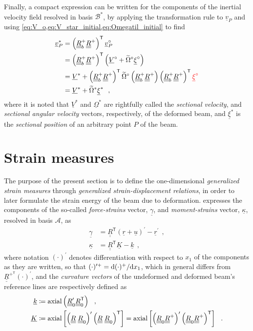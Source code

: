 \documentclass[12pt,a4paper,oneside,english]{abntex2} %
\newcommand{\fix}[1]{{\color{red}#1}}
\newcommand{\vect}[1]{\underline{#1}}
\def\tens#1{\underline{\underline{#1}}}
\def\til#1{\widetilde{#1}}
\def\lb{\left[}
\def\rb{\right]}
\def\lp{\left(}
\def\rp{\right)}
\def\T{\mathsf{T}}
\def\A{\mathcal{A}}
\def\B*{\mathcal{B}^*}
\def\axial{\textnormal{axial}}
\def\xo{x_1}
\def\R{\tens{R}}
\def\RT{\R^\T}
\def\Rp{\R^+}
\def\RpT{\R^{+^\T}}
\def\Rbp{\R^{+}_b}
\def\Rz{\R_0}
\def\RzT{\R^\T_0}
\def\r{\vect{r}}
\def\u{\vect{u}}
\def\vP{\vect{v}_P}
\def\vPo{\vP^{\circ}}
\def\vPs{\vP^{*}}
\def\gam{\vect{\gamma}}
\def\kap{\vect{\kappa}}
\def\k{\vect{k}}
\def\K{\vect{K}}
\def\xis{\vect{\xi}^{*}}
\def\xio{\vect{\xi}^{\circ}}
\def\V{\vect{V}}
\def\Vs{\V^{*}}
\def\Vo{\V^{\circ}}
\def\Om{\vect{\Omega}}
\def\Oms{\Om^{*}}
\def\Omtil{\til{\Omega}}
\def\Omtils{\Omtil^{*}}
\def\Omtilo{\Omtil^{\circ}}
\def\d{\textnormal{d}}
\begin{document}
Finally, a compact expression can be written for the components of the inertial velocity field resolved in basis $\B*$, by applying the transformation rule to $\vP$ and using \cref{eq:V_o,eq:V_star_initial,eq:Omegatil_initial} to find
\begin{align}
    \vPs &= \lp\Rbp\Rp\rp^\T \vPo \nonumber 
    \\
    &= \lp\Rbp\Rp\rp^\T \lp \Vo + \Omtilo\xio \rp \nonumber 
    \\
    &= \Vs + \lp\Rbp\Rp\rp^\T\Omtilo\lp\Rbp\Rp\rp\lp\Rbp\Rp\rp^\T\fix{\xio} \nonumber
    \\
    &= \Vs + \Omtils\xis \ \ ,
    \label{eq:v_P_star}
\end{align}
where it is noted that $\Vs$ and $\Oms$ are rightfully called the \textit{sectional velocity}, and \textit{sectional angular velocity} vectors, respectively, of the deformed beam, and $\xis$ is the \textit{sectional position} of an arbitrary point $P$ of the beam.


\section{Strain measures}
\label{sec:strain}

The purpose of the present section is to define the one-dimensional \textit{generalized strain measures} through \textit{generalized strain-displacement relations}, in order to later formulate the strain energy of the beam due to deformation.  expresses the components of the so-called \textit{force-strains} vector, $\gam$, and \textit{moment-strains} vector, $\kap$, resolved in basis $\A$, as
\begin{align}
    \gam 
    &= \RT\lp\r+\u\rp^\prime-\r^\prime \ \ ,
    \label{eq:gamma_def}
    \\
    \kap &= \RT\K - \k \ \ ,
    \label{eq:kappa_def}
\end{align}
where notation $(\cdot{})^{\prime}$ denotes differentiation with respect to $\xo$ \fix{of the components as they are written, so that $(\cdot{})^{\prime +}=\d(\cdot{})^{+}/\d\xo$, which in general differs from $\RpT(\cdot{})^\prime$}, and the \textit{curvature vectors} of the undeformed and deformed beam's reference lines are respectively defined as 
\begin{align}
    \k &\coloneqq \axial\lp\Rz^{\prime}\RzT\rp \ \ ,
    \label{eq:k_def}
    \\
    \K &\coloneqq \axial\lb\lp\R\;\Rz\rp^{\prime} \lp\R\;\Rz\rp^\T\rb =
    \axial\lb\lp\Rz\Rp\rp^{\prime} \lp\Rz\Rp\rp^\T\rb \ \ .
    \label{eq:K_def}    
\end{align}
\end{document}

